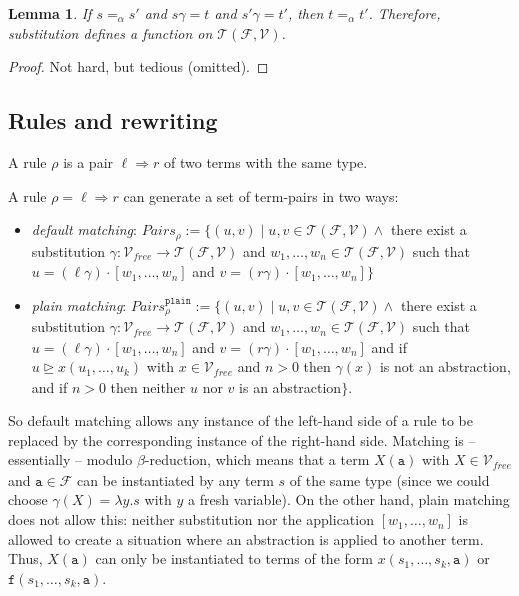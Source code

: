 \documentclass{lmcs}
\theoremstyle{theorem}\newtheorem{theorem}{Theorem}
\theoremstyle{theorem}\newtheorem{lemma}[theorem]{Lemma}
\theoremstyle{theorem}\newtheorem{corollary}[theorem]{Corollary}
\theoremstyle{definition}\newtheorem{definition}[theorem]{Definition}
\theoremstyle{definition}\newtheorem{example}[theorem]{Example}
\newcommand{\F}{\mathcal{F}}
\newcommand{\V}{\mathcal{V}}
\newcommand{\Vfree}{\mathcal{V}_{\mathit{free}}}
\newcommand{\Terms}{\mathcal{T}}
\newcommand{\identifier}[1]{\mathtt{#1}}
\newcommand{\afun}{\identifier{f}}
\newcommand{\abs}[2]{\lambda #1.#2}
\newcommand{\arrz}{\Rightarrow}
\newcommand{\suptermeq}{\unrhd}
\begin{document}
\begin{lemma}\label{lem:substitutionalpha}
If $s =_\alpha s'$ and $s\gamma = t$ and $s'\gamma = t'$, then $t =_\alpha t'$.
Therefore, substitution defines a function on $\Terms(\F,\V)$.
\end{lemma}

\begin{proof}
Not hard, but tedious (omitted).
\end{proof}

\subsection{Rules and rewriting}

A rule $\rho$ is a pair $\ell \arrz r$ of two terms with the same type.

A rule $\rho = \ell \arrz r$ can generate a set of term-pairs in two ways:
\begin{itemize}
\item \emph{default matching}: $\mathit{Pairs}_\rho := \{ (u,v) \mid u,v \in \Terms(\F,\V) \wedge$
  there exist a substitution $\gamma : \Vfree \to \Terms(\F,\V)$ and $w_1,\dots,w_n \in
  \Terms(\F,\V)$ such that $u = (\ell\gamma) \cdot [w_1,\dots,w_n]$ and
  $v = (r\gamma) \cdot [w_1,\dots,w_n] \}$
\item \emph{plain matching}: $\mathit{Pairs}_\rho^{\mathtt{plain}} := \{ (u,v) \mid u,v \in
  \Terms(\F,\V) \wedge$ there exist a substitution $\gamma : \Vfree \to \Terms(\F,\V)$ and $w_1,
  \dots,w_n \in \Terms(\F,\V)$ such that $u = (\ell\gamma) \cdot [w_1,\dots,w_n]$ and
  $v = (r\gamma) \cdot [w_1,\dots,w_n]$ and if $u \suptermeq x(u_1,\dots,u_k)$ with $x \in
  \Vfree$ and $n > 0$ then $\gamma(x)$ is not an abstraction, and if $n > 0$ then neither
  $u$ nor $v$ is an abstraction$\}$.
\end{itemize}
So default matching allows any instance of the left-hand side of a rule to be replaced by the
corresponding instance of the right-hand side. Matching is -- essentially -- modulo
$\beta$-reduction, which means that a term $X(\mathtt{a})$ with $X \in \Vfree$ and
$\mathtt{a} \in \F$ can be instantiated by any term $s$ of the same type (since we could
choose $\gamma(X) = \abs{y}{s}$ with $y$ a fresh variable).
On the other hand, plain matching does not allow this: neither substitution nor the
application $[w_1,\dots,w_n]$ is allowed to create a situation where an abstraction is applied
to another term. Thus, $X(\mathtt{a})$ can only be instantiated to terms of the form
$x(s_1,\dots,s_k,\mathtt{a})$ or $\afun(s_1,\dots,s_k,\mathtt{a})$.
\end{document}
